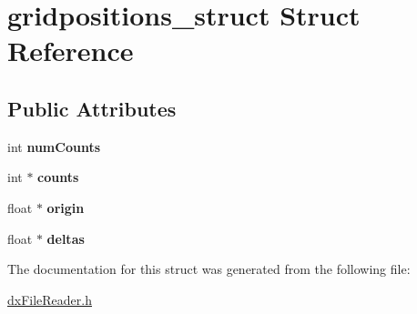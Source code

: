 \hypertarget{structgridpositions__struct}{
\section{gridpositions\_\-struct Struct Reference}
\label{structgridpositions__struct}
}
\subsection*{Public Attributes}
\begin{DoxyCompactItemize}
\item 
\hypertarget{structgridpositions__struct_a7598dd515ec2641e4185e6835db66d2e}{
int {\bfseries numCounts}}
\label{structgridpositions__struct_a7598dd515ec2641e4185e6835db66d2e}

\item 
\hypertarget{structgridpositions__struct_ad3f30bbe4b443c165cd42afd4f1f48c2}{
int $\ast$ {\bfseries counts}}
\label{structgridpositions__struct_ad3f30bbe4b443c165cd42afd4f1f48c2}

\item 
\hypertarget{structgridpositions__struct_aa458c4e8d1363963fc13dac31f13f676}{
float $\ast$ {\bfseries origin}}
\label{structgridpositions__struct_aa458c4e8d1363963fc13dac31f13f676}

\item 
\hypertarget{structgridpositions__struct_af6c2315d2528d40ef4588457334ff811}{
float $\ast$ {\bfseries deltas}}
\label{structgridpositions__struct_af6c2315d2528d40ef4588457334ff811}

\end{DoxyCompactItemize}


The documentation for this struct was generated from the following file:\begin{DoxyCompactItemize}
\item 
\hyperlink{dxFileReader_8h}{dxFileReader.h}\end{DoxyCompactItemize}
